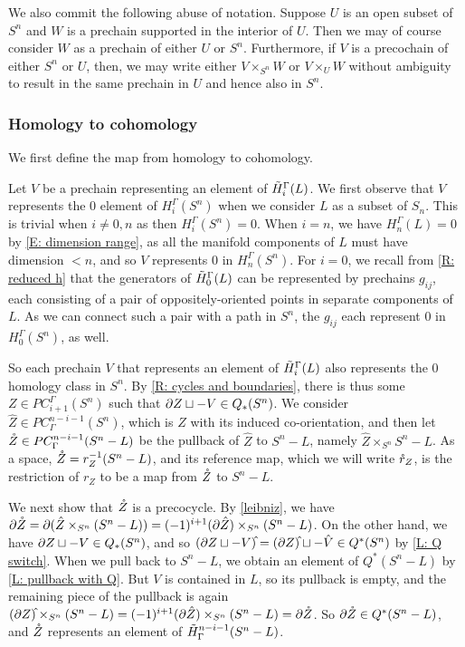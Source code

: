 We also commit the following abuse of notation.
Suppose $U$ is an open subset of $S^n$ and $W$ is a prechain supported in the interior of $U$.
Then we may of course consider $W$ as a prechain of either $U$ or $S^n$.
Furthermore, if $V$ is a precochain of either $S^n$ or $U$, then, we may write either $V \times_{S^n} W$ or $V \times_U W$ without ambiguity to result in the same prechain in $U$ and hence also in $S^n$.


\subsubsection{Homology to cohomology} We first define the map from homology to cohomology.

Let $V$ be a prechain representing an element of $\tilde H_i^\Gamma(L)$.
We first observe that $V$ represents the $0$ element of $H_i^\Gamma(S^n)$ when we consider $L$ as a subset of $S_n$.
This is trivial when $i \neq 0,n$ as then $H_i^\Gamma(S^n)=0$.
When $i = n$, we have $H_n^\Gamma(L) = 0$ by \cref{E: dimension range}, as all the manifold components of $L$ must have dimension $<n$, and so $V$ represents $0$ in $H_n^\Gamma(S^n)$.
For $i=0$, we recall from \cref{R: reduced h} that the generators of $\tilde H_0^\Gamma(L)$ can be represented by prechains $g_{ij}$, each consisting of a pair of oppositely-oriented points in separate components of $L$.
As we can connect such a pair with a path in $S^n$, the $g_{ij}$ each represent $0$ in $H_0^\Gamma(S^n)$, as well.

So each prechain $V$ that represents an element of $\tilde H_i^\Gamma(L)$ also represents the $0$ homology class in $S^n$. By \cref{R: cycles and boundaries}, there is thus some $Z \in PC^\Gamma_{i+1}(S^n)$ such that $\partial Z \sqcup -V \in Q_*(S^n)$.
We consider $\hat Z \in PC_\Gamma^{n-i-1}(S^n)$, which is $Z$ with its induced co-orientation, and then let $\mathring{Z} \in PC_\Gamma^{n-i-1}(S^n - L)$ be the pullback of $\hat Z$ to $S^n-L$, namely $\hat Z \times_{S^n} S^n - L$.
As a space, $\mathring{Z} = r_Z^{-1}(S^n-L)$, and its reference map, which we will write $\mathring{r}_Z$, is the restriction of $r_Z$ to be a map from $\mathring{Z}$ to $S^n-L$.

We next show that $\mathring{Z}$ is a precocycle.
By \cref{leibniz}, we have $\partial{\mathring{Z}} = \partial (\hat Z \times_{S^n} (S^n - L)) = (-1)^{i+1} (\partial \hat Z) \times_{S^n} (S^n - L)$.
On the other hand, we have $\partial Z \sqcup -V \in Q_*(S^n)$, and so $(\bd Z \sqcup -V)\hat{\vrule height1.3ex width0pt} = (\bd Z)\hat{\vrule height1.3ex width0pt} \sqcup - \hat V \in Q^*(S^n)$ by \cref{L: Q switch}.
When we pull back to $S^n - L$, we obtain an element of $Q^*(S^n - L)$ by \cref{L: pullback with Q}.
But $V$ is contained in $L$, so its pullback is empty, and the remaining piece of the pullback is again
$(\bd Z)\hat{\vrule height1.3ex width0pt} \times_{S^n} (S^n - L) = (-1)^{i+1} (\bd \hat Z) \times_{S^n} (S^n - L) = \bd{\mr Z}$.
So $\partial{\mathring{Z}} \in Q^*(S^n - L)$, and $\mathring{Z}$ represents an element of $\tilde H^{n-i-1}_\Gamma(S^n - L)$.

